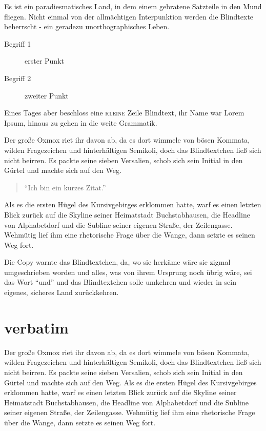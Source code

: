 \documentclass[%
	12pt,%
	a4paper,%
	oneside,%
	liststotoc, idxtotoc, bibtotoc, %
	parskip=half,%
	nochapterprefix,%
	appendixprefix, %
	headings=small,%
]{scrreprt}
\begin{document}
Es ist ein paradiesmatisches Land, in dem einem gebratene Satzteile in den Mund fliegen. Nicht einmal von der allmächtigen Interpunktion werden die Blindtexte beherrscht - ein geradezu unorthographisches Leben. 

\begin{description}
	\item[Begrif\/f 1] erster Punkt
	\item[Begrif\/f 2] zweiter Punkt 
\end{description}

Eines Tages aber beschloss eine \textsc{kleine} Zeile Blindtext, ihr Name war Lorem Ipsum, hinaus zu gehen in die weite Grammatik.

Der große Oxmox riet ihr davon ab, da es dort wimmele von bösen Kommata, wilden Fragezeichen und hinterhältigen Semikoli, doch das Blindtextchen ließ sich nicht beirren. Es packte seine sieben Versalien, schob sich sein Initial in den Gürtel und machte sich auf den Weg.  \begin{quote}"`Ich bin ein kurzes Zitat."'\end{quote} Als es die ersten Hügel des Kursivgebirges erklommen hatte, warf es einen letzten Blick zurück auf die Skyline seiner Heimatstadt Buchstabhausen, die Headline von Alphabetdorf und die Subline seiner eigenen Straße, der Zeilengasse. Wehmütig lief ihm eine rhetorische Frage über die Wange, dann setzte es seinen Weg fort.

Die Copy warnte das Blindtextchen, da, wo sie herkäme wäre sie zigmal umgeschrieben worden und alles, was von ihrem Ursprung noch übrig wäre, sei das Wort "`und"'  und das Blindtextchen solle umkehren und wieder in sein eigenes, sicheres Land zurückkehren.

\chapter{verbatim}
Der große Oxmox riet ihr davon ab, da es dort wimmele von bösen Kommata, wilden Fragezeichen und hinterhältigen Semikoli, doch das Blindtextchen ließ sich nicht beirren. Es packte seine sieben Versalien, schob sich sein Initial in den Gürtel und machte sich auf den Weg. Als es die ersten Hügel des Kursivgebirges erklommen hatte, warf es einen letzten Blick zurück auf die Skyline seiner Heimatstadt Buchstabhausen, die Headline von Alphabetdorf und die Subline seiner eigenen Straße, der Zeilengasse. Wehmütig lief ihm eine rhetorische Frage über die Wange, dann setzte es seinen Weg fort.
\end{document}
